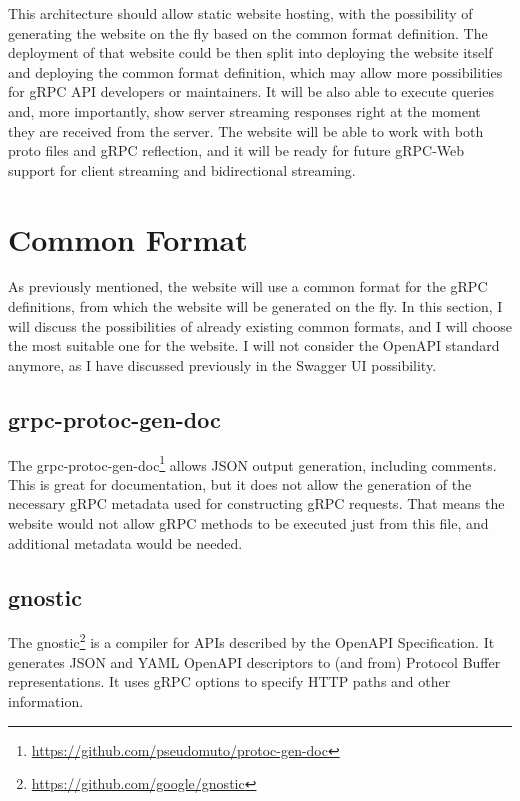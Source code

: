 This architecture should allow static website hosting, with the possibility of generating the website on the fly based on the common format definition.
The deployment of that website could be then split into deploying the website itself and deploying the common format definition, which may allow more possibilities for gRPC API developers or maintainers.
It will be also able to execute queries and, more importantly, show server streaming responses right at the moment they are received from the server.
The website will be able to work with both proto files and gRPC reflection, and it will be ready for future gRPC-Web support for client streaming and bidirectional streaming.


\section{Common Format}
As previously mentioned, the website will use a common format for the gRPC definitions, from which the website will be generated on the fly.
In this section, I will discuss the possibilities of already existing common formats, and I will choose the most suitable one for the website.
I will not consider the OpenAPI standard anymore, as I have discussed previously in the Swagger UI possibility.


\subsection{grpc-protoc-gen-doc}
The grpc-protoc-gen-doc\footnote{\url{https://github.com/pseudomuto/protoc-gen-doc}} allows JSON output generation, including comments.
This is great for documentation, but it does not allow the generation of the necessary gRPC metadata used for constructing gRPC requests.
That means the website would not allow gRPC methods to be executed just from this file, and additional metadata would be needed.

\subsection{gnostic}
The gnostic\footnote{\url{https://github.com/google/gnostic}} is a compiler for APIs described by the OpenAPI Specification.
It generates JSON and YAML OpenAPI descriptors to (and from) Protocol Buffer representations.
It uses gRPC options to specify HTTP paths and other information.
\cite{gnostic}

